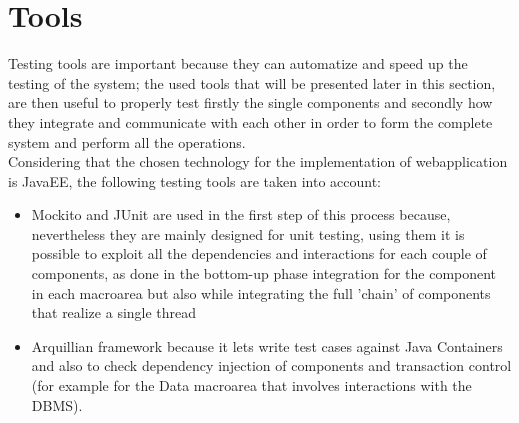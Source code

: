 \documentclass[11pt,a4paper]{report}
\begin{document}
\section{Tools}
Testing tools are important because they can automatize and speed up the testing of the system; the used tools that will be presented later in this section, are then useful to properly test firstly the single components and secondly how they integrate and communicate with each other in order to form the complete system and perform all the operations.\\
Considering that the chosen technology for the implementation of webapplication is JavaEE, the following testing tools are taken into account:
\begin{itemize}
	\item Mockito and JUnit are used in the first step of this process because, nevertheless they are mainly designed for unit testing, using them it is possible to exploit all the dependencies and interactions for each couple of components, as done in the bottom-up phase integration for the component in each macroarea but also while integrating the full 'chain' of components that realize a single thread
	\item Arquillian framework because it lets write test cases against Java Containers and also to check dependency injection of components and transaction control (for example for the Data macroarea that involves interactions with the DBMS).
\end{itemize}
\end{document}
